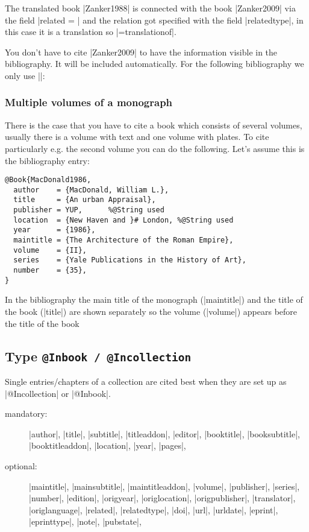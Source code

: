 \documentclass[a4paper,
10pt,
greek,
french,
spanish,
italian,
ngerman,
english
]{ltxdoc}
\begin{document}
The translated book |Zanker1988| is connected with the book |Zanker2009| via the field |related = | and the relation got specified with the field |relatedtype|, in this case it is a translation so |={translationof}|.

You don’t have to cite |Zanker2009| to have the information visible in the bibliography. 
It will be included automatically. For the following bibliography we only use |\cite{Zanker1988}|:



 \subsubsection{Multiple volumes of a monograph}
There is the case that you have to cite a book which consists of several volumes, 
usually there is a volume with text and one volume with plates.
To cite particularly e.g. the second volume you can do the following.
Let’s assume this is the bibliography entry:
\begin{lstlisting}[style=bibentry,label=MacDonald1986,caption={{@}Book\{MacDonald1986,…\} }]
@Book{MacDonald1986,
  author    = {MacDonald, William L.},
  title     = {An urban Appraisal},
  publisher = YUP,		%@String used
  location  = {New Haven and }# London, %@String used
  year      = {1986},
  maintitle = {The Architecture of the Roman Empire},
  volume    = {II},
  series    = {Yale Publications in the History of Art},
  number    = {35},
}
\end{lstlisting}
In the bibliography the main title of the monograph  (|maintitle|) and the title of the book (|title|) are shown separately  so the volume  (|volume|) appears before the title of the book


 \subsection{Type \texttt{@Inbook / @Incollection}}\label{inbook}
Single entries/chapters of a collection are cited best when they are set up as  |@Incollection| or |@Inbook|.

\begin{description}
\item[mandatory:] 
|author|, |title|, |subtitle|, |titleaddon|,
|editor|,  |booktitle|, |booksubtitle|, |booktitleaddon|,
|location|, |year|, |pages|, 
\item[optional:]
|maintitle|, |mainsubtitle|, |maintitleaddon|, |volume|, 
|publisher|, |series|, |number|, |edition|, 
|origyear|, |origlocation|, |origpublisher|, 
|translator|, |origlanguage|,
|related|, |relatedtype|,
|doi|, |url|, |urldate|, |eprint|, |eprinttype|, |note|, |pubstate|, 
 \end{description}
 
\end{document}
